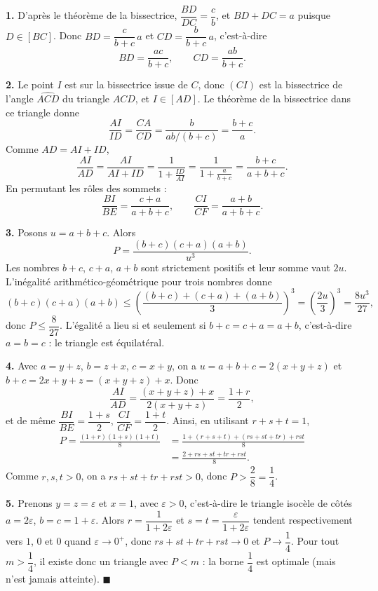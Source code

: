 \textbf{1.} D'après le théorème de la bissectrice, $\dfrac{BD}{DC} = \dfrac{c}{b}$,
et $BD + DC = a$ puisque $D \in [BC]$. Donc $BD = \dfrac{c}{b+c}\,a$ et
$CD = \dfrac{b}{b+c}\,a$, c'est-à-dire
\[
BD = \frac{ac}{b+c}, \qquad CD = \frac{ab}{b+c}.
\]

\textbf{2.} Le point $I$ est sur la bissectrice issue de $C$, donc $(CI)$
est la bissectrice de l'angle $\widehat{ACD}$ du triangle $ACD$, et
$I \in [AD]$. Le théorème de la bissectrice dans ce triangle donne
\[
\frac{AI}{ID} = \frac{CA}{CD} = \frac{b}{ab/(b+c)} = \frac{b+c}{a}.
\]
Comme $AD = AI + ID$,
\[
\frac{AI}{AD} = \frac{AI}{AI + ID} = \frac{1}{1 + \frac{ID}{AI}}
= \frac{1}{1 + \frac{a}{b+c}} = \frac{b+c}{a+b+c}.
\]
En permutant les rôles des sommets :
\[
\frac{BI}{BE} = \frac{c+a}{a+b+c}, \qquad \frac{CI}{CF} = \frac{a+b}{a+b+c}.
\]

\textbf{3.} Posons $u = a+b+c$. Alors
\[
P = \frac{(b+c)(c+a)(a+b)}{u^3}.
\]
Les nombres $b+c$, $c+a$, $a+b$ sont strictement positifs et leur somme vaut
$2u$. L'inégalité arithmético-géométrique pour trois nombres donne
\[
(b+c)(c+a)(a+b) \leqslant \left( \frac{(b+c)+(c+a)+(a+b)}{3} \right)^3
= \left( \frac{2u}{3} \right)^3 = \frac{8u^3}{27},
\]
donc $P \leqslant \dfrac{8}{27}$. L'égalité a lieu si et seulement si
$b+c = c+a = a+b$, c'est-à-dire $a = b = c$ : le triangle est équilatéral.

\textbf{4.} Avec $a = y+z$, $b = z+x$, $c = x+y$, on a
$u = a+b+c = 2(x+y+z)$ et $b + c = 2x + y + z = (x+y+z) + x$. Donc
\[
\frac{AI}{AD} = \frac{(x+y+z) + x}{2(x+y+z)} = \frac{1 + r}{2},
\]
et de même $\dfrac{BI}{BE} = \dfrac{1+s}{2}$, $\dfrac{CI}{CF} = \dfrac{1+t}{2}$.
Ainsi, en utilisant $r + s + t = 1$,
\[
\begin{aligned}
P = \frac{(1+r)(1+s)(1+t)}{8}
&= \frac{1 + (r+s+t) + (rs+st+tr) + rst}{8} \\
&= \frac{2 + rs + st + tr + rst}{8}.
\end{aligned}
\]
Comme $r, s, t > 0$, on a $rs + st + tr + rst > 0$, donc $P > \dfrac{2}{8} = \dfrac14$.

\textbf{5.} Prenons $y = z = \varepsilon$ et $x = 1$, avec $\varepsilon > 0$,
c'est-à-dire le triangle isocèle de côtés $a = 2\varepsilon$,
$b = c = 1 + \varepsilon$. Alors $r = \dfrac{1}{1+2\varepsilon}$ et
$s = t = \dfrac{\varepsilon}{1+2\varepsilon}$ tendent respectivement vers $1$,
$0$ et $0$ quand $\varepsilon \to 0^+$, donc $rs + st + tr + rst \to 0$ et
$P \to \dfrac14$. Pour tout $m > \dfrac14$, il existe donc un triangle avec
$P < m$ : la borne $\dfrac14$ est optimale (mais n'est jamais atteinte).
\hfill $\blacksquare$

